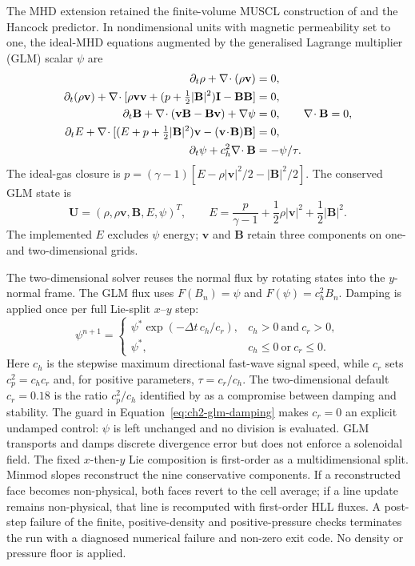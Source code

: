 The MHD extension retained the finite-volume MUSCL construction of
\citet{vanLeer1979muscl} and the Hancock predictor. In nondimensional units
with magnetic permeability set to one, the ideal-MHD equations augmented by
the generalised Lagrange multiplier (GLM) scalar $\psi$ are
\begin{align}
 \partial_t\rho+\nabla\!\cdot(\rho\mathbf v)&=0, \notag\\
 \partial_t(\rho\mathbf v)+\nabla\!\cdot
 [\rho\mathbf v\mathbf v+(p+\tfrac12|\mathbf B|^2)\mathbf I
   -\mathbf B\mathbf B]&=0, \notag\\
 \partial_t\mathbf B+\nabla\!\cdot(\mathbf v\mathbf B-\mathbf B\mathbf v)
   +\nabla\psi&=0, \qquad \nabla\!\cdot\mathbf B=0, \notag\\
 \partial_tE+\nabla\!\cdot[(E+p+\tfrac12|\mathbf B|^2)\mathbf v
   -(\mathbf v\!\cdot\!\mathbf B)\mathbf B]&=0, \notag\\
 \partial_t\psi+c_h^2\nabla\!\cdot\mathbf B&=-\psi/\tau.
 \label{eq:ch2-ideal-mhd}
\end{align}
The ideal-gas closure is $p=(\gamma-1)[E-\rho|\mathbf v|^2/2-
|\mathbf B|^2/2]$. The conserved GLM state is
\begin{equation}
 \mathbf{U}=(\rho,\rho\mathbf{v},\mathbf{B},E,\psi)^{T},\qquad
 E=\frac{p}{\gamma-1}+\frac{1}{2}\rho|\mathbf{v}|^{2}
   +\frac{1}{2}|\mathbf{B}|^{2}.
 \label{eq:ch2-mhd-state}
\end{equation}
The implemented $E$ excludes $\psi$ energy; $\mathbf v$ and $\mathbf B$ retain
three components on one- and two-dimensional grids.

The two-dimensional solver reuses the normal flux by rotating states into the
$y$-normal frame. The GLM flux uses $F(B_n)=\psi$ and
$F(\psi)=c_h^2B_n$. Damping is applied once per full Lie-split $x$--$y$ step:
\begin{equation}
 \psi^{n+1}=\begin{cases}
 \psi^{*}\exp(-\Delta t\,c_h/c_r),&c_h>0\ \text{and}\ c_r>0,\\
 \psi^{*},&c_h\leq0\ \text{or}\ c_r\leq0.
 \end{cases}
 \label{eq:ch2-glm-damping}
\end{equation}
Here $c_h$ is the stepwise maximum directional fast-wave signal speed, while
$c_r$ sets $c_p^2=c_hc_r$ and, for positive parameters, $\tau=c_r/c_h$.
The two-dimensional default $c_r=0.18$ is the ratio $c_p^2/c_h$ identified by
\citet{dedner2002glm} as a compromise between damping and stability. The guard
in Equation~\ref{eq:ch2-glm-damping} makes $c_r=0$ an explicit undamped control:
$\psi$ is left unchanged and no division is evaluated. GLM transports and
damps discrete divergence error but does not enforce a solenoidal field.
The fixed $x$-then-$y$ Lie composition is first-order as a multidimensional
split. Minmod slopes reconstruct the nine conservative components. If a
reconstructed face becomes non-physical, both faces revert to the cell average;
if a line update remains non-physical, that line is recomputed with first-order
HLL fluxes. A post-step failure of the finite, positive-density and
positive-pressure checks terminates the run with a diagnosed numerical failure
and non-zero exit code. No density or pressure floor is applied.

